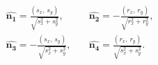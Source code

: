 \documentclass{article}
\begin{document}
  \begin{align*}
    \hat{\boldsymbol{n_1}} = \frac{(s_x, \, s_y)}{\sqrt{s_x^2 + s_y^2}}, & \quad
    \hat{\boldsymbol{n_2}} = -\frac{(r_x, \, r_y)}{\sqrt{r_x^2 + r_y^2}}, \\
    \hat{\boldsymbol{n_3}} = -\frac{(s_x, \, s_y)}{\sqrt{s_x^2 + s_y^2}}, & \quad
    \hat{\boldsymbol{n_4}} = \frac{(r_x, \, r_y)}{\sqrt{s_x^2 + s_y^2}}. \\
  \end{align*}


\end{document}
